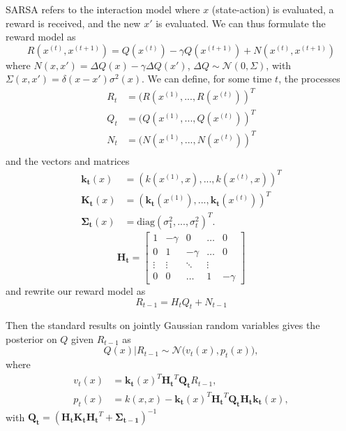 \documentclass[10pt, twocolumn, twoside]{article}
\begin{document}
SARSA refers to the interaction model where $x$ (state-action) is evaluated, a reward is received,
and the new $x'$ is evaluated. We can thus formulate the reward model as
\begin{equation*}
R(x^{(t)}, x^{(t+1)}) = Q(x^{(t)}) - \gamma Q(x^{(t+1)}) + N(x^{(t)}, x^{(t+1)})
\end{equation*}
where $N(x, x') = \Delta Q(x) - \gamma \Delta Q(x')$, $\Delta Q \sim \mathcal{N}(0,\Sigma)$,
with $\Sigma(x, x') = \delta(x - x')\sigma^2(x)$. We can define, for some time $t$, the processes
\begin{align*}
R_t &= (R(x^{(1)},..., R(x^{(t)}))^T \\
Q_t &= (Q(x^{(1)},..., Q(x^{(t)}))^T \\
N_t &= (N(x^{(1)},..., N(x^{(t)}))^T \\
\end{align*}
and the vectors and matrices
\begin{align*}
\mathbf{k_t}(x) &= (k(x^{(1)}, x), ..., k(x^{(t)}, x))^T\\
\mathbf{K_t}(x) &= (\mathbf{k_t}(x^{(1)}), ..., \mathbf{k_t}(x^{(t)}))^T\\
\mathbf{\Sigma_t}(x) &= \textrm{diag}(\sigma_1^2,...,\sigma_t^2)^T.
\end{align*}
$$\mathbf{H_t} =
\begin{bmatrix}
1 & -\gamma & 0 & \ldots & 0 \\
0 & 1 & -\gamma & \ldots & 0 \\
\vdots & \vdots & \ddots & \vdots \\
0 & 0 & \ldots & 1 & -\gamma
\end{bmatrix}$$ and rewrite our reward model as
\begin{equation}
R_{t-1} = H_t Q_t + N_{t-1}
\end{equation}

\newcommand{\Ht}{\mathbf{H_t}}
\newcommand{\Qt}{\mathbf{Q_t}}
\newcommand{\kt}{\mathbf{k_t}}
\newcommand{\Kt}{\mathbf{K_t}}
\newcommand{\St}{\mathbf{\Sigma_{t-1}}}

Then the standard results on jointly Gaussian random variables gives the posterior on $Q$ given
$R_{t-1}$ as
\begin{equation}
Q(x)|R_{t-1} \sim \mathcal{N}\big(v_t(x), p_t(x)\big),
\end{equation}
where
\begin{align*}
v_t(x) &= \kt(x)^T \Ht^T \Qt R_{t-1},\\
p_t(x) &= k(x, x) - \kt(x)^T \Ht^T \Qt \Ht \kt(x),
\end{align*}
with $\Qt = (\Ht\Kt\Ht^T + \St)^{-1}$
\end{document}
